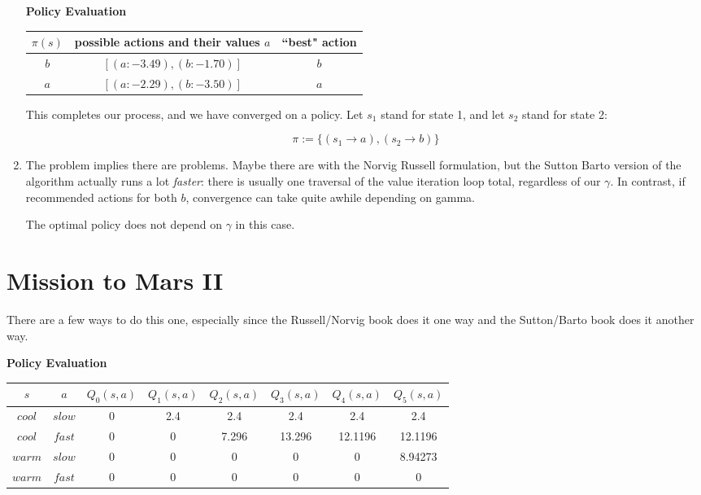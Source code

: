 \documentclass[11pt]{article}
\begin{document}
\begin{enumerate}
\begin{center}
\textbf{Policy Evaluation}
\begin{tabular}{ | c | c | c | }
\hline
  $\pi(s)$ & possible actions and their values $a$ & ``best" action \\
  \hline
  \hline
  $b$ & $[(a: -3.49), (b: -1.70)]$ & $b$ \\
  $a$ & $[(a: -2.29), (b: -3.50)]$ & $a$ \\
  \hline
\end{tabular}
\end{center}

This completes our process, and we have converged on a policy. Let $s_1$ stand for state 1, and let $s_2$ stand for state 2:

\begin{equation}
\pi := \{ (s_1 \rightarrow a), (s_2 \rightarrow b) \}
\end{equation}

\item The problem implies there are problems. Maybe there are with the Norvig Russell formulation, but the Sutton Barto version of the algorithm actually runs a lot \textit{faster}: there is usually one traversal of the value iteration loop total, regardless of our $\gamma$. In contrast, if recommended actions for both $b$, convergence can take quite awhile depending on gamma.

The optimal policy does not depend on $\gamma$ in this case.



\end{enumerate}










\section{Mission to Mars II}

There are a few ways to do this one, especially since the Russell/Norvig book does it one way and the Sutton/Barto book does it another way.

\begin{center}
\textbf{Policy Evaluation}
\begin{tabular}{ | c | c | c | c | c | c | c | c | }
\hline
  $s$ & $a$ & $Q_0(s,a)$ & $Q_1(s,a)$ & $Q_2(s,a)$ & $Q_3(s,a)$ & $Q_4(s,a)$ & $Q_5(s,a)$ \\
  \hline
  \hline
  $cool$ & $slow$ & 0 & 2.4 & 2.4 & 2.4 & 2.4 & 2.4 \\
  $cool$ & $fast$ & 0  & 0 & 7.296 & 13.296 & 12.1196 & 12.1196 \\
  $warm$ & $slow$ & 0 & 0 & 0 & 0 & 0 & 8.94273 \\
  $warm$ & $fast$ & 0 & 0 & 0 & 0 & 0 & 0 \\
  \hline
\end{tabular}
\end{center}
\end{document}
